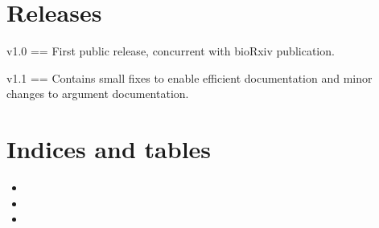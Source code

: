 \documentclass[letterpaper,12pt,english]{sphinxmanual}
\begin{document}
\chapter{Releases}
\label{\detokenize{releases:releases}}\label{\detokenize{releases::doc}}\label{\detokenize{releases:id1}}
v1.0
==
First public release, concurrent with bioRxiv publication.

v1.1
==
Contains small fixes to enable efficient documentation and minor changes to argument documentation.


\chapter{Indices and tables}
\label{\detokenize{index:indices-and-tables}}\begin{itemize}
\item {} 

\item {} 

\item {} 

\end{itemize}



\renewcommand{\indexname}{Index}
\printindex
\end{document}
